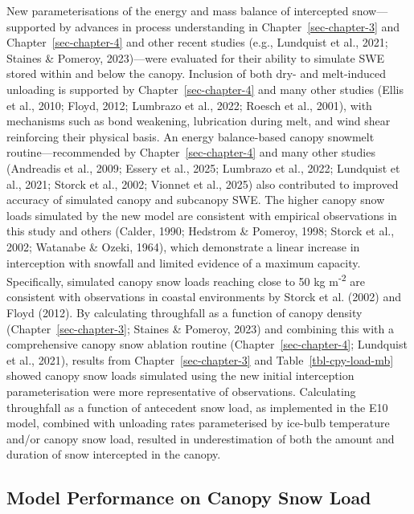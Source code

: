 \documentclass[
  letterpaper,
]{tex/uofsthesis-cs}
\begin{document}
New parameterisations of the energy and mass balance of intercepted
snow---supported by advances in process understanding in
Chapter~\ref{sec-chapter-3} and Chapter~\ref{sec-chapter-4} and other
recent studies (e.g., Lundquist et al., 2021; Staines \& Pomeroy,
2023)---were evaluated for their ability to simulate SWE stored within
and below the canopy. Inclusion of both dry- and melt-induced unloading
is supported by Chapter~\ref{sec-chapter-4} and many other studies
(Ellis et al., 2010; Floyd, 2012; Lumbrazo et al., 2022; Roesch et al.,
2001), with mechanisms such as bond weakening, lubrication during melt,
and wind shear reinforcing their physical basis. An energy balance-based
canopy snowmelt routine---recommended by Chapter~\ref{sec-chapter-4} and
many other studies (Andreadis et al., 2009; Essery et al., 2025;
Lumbrazo et al., 2022; Lundquist et al., 2021; Storck et al., 2002;
Vionnet et al., 2025) also contributed to improved accuracy of simulated
canopy and subcanopy SWE. The higher canopy snow loads simulated by the
new model are consistent with empirical observations in this study and
others (Calder, 1990; Hedstrom \& Pomeroy, 1998; Storck et al., 2002;
Watanabe \& Ozeki, 1964), which demonstrate a linear increase in
interception with snowfall and limited evidence of a maximum capacity.
Specifically, simulated canopy snow loads reaching close to 50 kg
m\textsuperscript{-2} are consistent with observations in coastal
environments by Storck et al. (2002) and Floyd (2012). By calculating
throughfall as a function of canopy density
(Chapter~\ref{sec-chapter-3}; Staines \& Pomeroy, 2023) and combining
this with a comprehensive canopy snow ablation routine
(Chapter~\ref{sec-chapter-4}; Lundquist et al., 2021), results from
Chapter~\ref{sec-chapter-3} and Table~\ref{tbl-cpy-load-mb} showed
canopy snow loads simulated using the new initial interception
parameterisation were more representative of observations. Calculating
throughfall as a function of antecedent snow load, as implemented in the
E10 model, combined with unloading rates parameterised by ice-bulb
temperature and/or canopy snow load, resulted in underestimation of both
the amount and duration of snow intercepted in the canopy.

\subsection{Model Performance on Canopy Snow
Load}\label{model-performance-on-canopy-snow-load}
\end{document}
